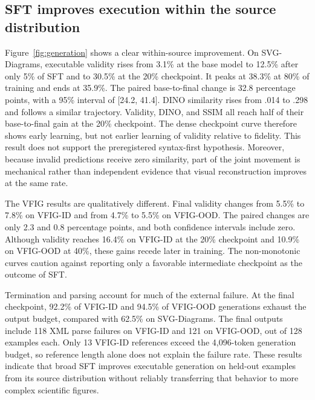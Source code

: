 \documentclass{article}
\begin{document}
\subsection{SFT improves execution within the source distribution}

Figure~\ref{fig:generation} shows a clear within-source improvement. On SVG-Diagrams, executable validity rises from 3.1\% at the base model to 12.5\% after only 5\% of SFT and to 30.5\% at the 20\% checkpoint. It peaks at 38.3\% at 80\% of training and ends at 35.9\%. The paired base-to-final change is 32.8 percentage points, with a 95\% interval of [24.2, 41.4]. DINO similarity rises from .014 to .298 and follows a similar trajectory. Validity, DINO, and SSIM all reach half of their base-to-final gain at the 20\% checkpoint. The dense checkpoint curve therefore shows early learning, but not earlier learning of validity relative to fidelity. This result does not support the preregistered syntax-first hypothesis. Moreover, because invalid predictions receive zero similarity, part of the joint movement is mechanical rather than independent evidence that visual reconstruction improves at the same rate.

The VFIG results are qualitatively different. Final validity changes from 5.5\% to 7.8\% on VFIG-ID and from 4.7\% to 5.5\% on VFIG-OOD. The paired changes are only 2.3 and 0.8 percentage points, and both confidence intervals include zero. Although validity reaches 16.4\% on VFIG-ID at the 20\% checkpoint and 10.9\% on VFIG-OOD at 40\%, these gains recede later in training. The non-monotonic curves caution against reporting only a favorable intermediate checkpoint as the outcome of SFT.

Termination and parsing account for much of the external failure. At the final checkpoint, 92.2\% of VFIG-ID and 94.5\% of VFIG-OOD generations exhaust the output budget, compared with 62.5\% on SVG-Diagrams. The final outputs include 118 XML parse failures on VFIG-ID and 121 on VFIG-OOD, out of 128 examples each. Only 13 VFIG-ID references exceed the 4,096-token generation budget, so reference length alone does not explain the failure rate. These results indicate that broad SFT improves executable generation on held-out examples from its source distribution without reliably transferring that behavior to more complex scientific figures.
\end{document}
